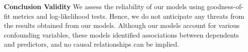 \vspace{2pt} \noindent \textbf{Conclusion Validity}
We assess the reliability of our models using goodness-of-fit metrics and log-likelihood tests. Hence, we do not anticipate any threats from the results obtained from our models.  Although our models account for various confounding variables, these models identified associations between dependents and predictors, and no causal relationships can be implied.
